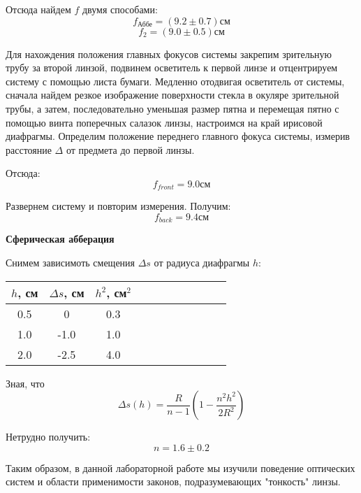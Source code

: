 \documentclass[14pt]{article}
\begin{document}
Отсюда найдем $f$ двумя способами:
$$
	f_{\text{Аббе}} = (9.2 \pm 0.7)\text{см}
$$
$$
	f_2 = (9.0 \pm 0.5)\text{см}
$$

Для нахождения положения главных фокусов системы закрепим зрительную
трубу за второй линзой, подвинем осветитель
к первой линзе и отцентрируем систему с помощью листа бумаги.
Медленно отодвигая осветитель от системы, сначала найдем резкое
изображение поверхности стекла в окуляре зрительной трубы,
а затем,
последовательно уменьшая размер пятна
и перемещая пятно с помощью
винта поперечных салазок линзы, настроимся на край ирисовой диафрагмы.
Определим положение переднего главного
фокуса системы, измерив расстояние $\Delta$ от предмета до первой линзы.

Отсюда:
$$
	f_{front} = 9.0\text{см}
$$

Развернем систему и повторим измерения. Получим:
$$
	f_{back} = 9.4\text{см}
$$

\vspace{1cm}
\textbf{Сферическая абберация} 

Снимем зависимоть смещения $\Delta s$ от радиуса диафрагмы $h$:
\begin{center}
\begin{tabular}{|c|c|c|c|c|c|c|c|c|c|c|}
\hline
$h$, см	&	$\Delta s$, см	&	$h^2$, см$^2$	\\
\hline
0.5		&	0				&	0.3				\\
\hline
1.0		&	-1.0			&	1.0				\\
\hline
2.0		&	-2.5			&	4.0				\\
\hline
\end{tabular}
\end{center}

\vspace{1cm}

Зная, что
$$
	\Delta s(h) = \frac{R}{n-1}\left(1 - \frac{n^2h^2}{2R^2}\right)
$$
	
Нетрудно получить:
$$
	n = 1.6 \pm 0.2
$$

\clearpage

Таким образом, в данной лабораторной работе мы изучили поведение оптических систем и области применимости законов, подразумевающих "тонкость" линзы.
\end{document}
